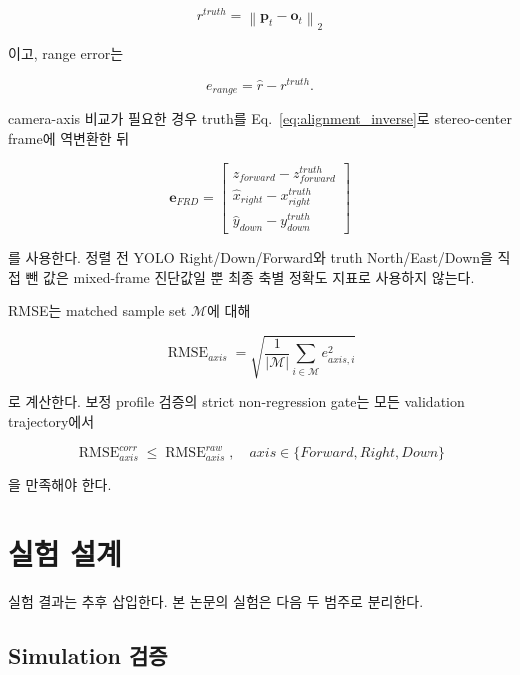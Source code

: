 \documentclass[10pt,conference]{IEEEtran}
\newcommand{\vect}[1]{\bm{#1}}
\newcommand{\norm}[1]{\left\lVert #1 \right\rVert_2}
\begin{document}
\begin{equation}
r^{truth}
=
\norm{
\vect{p}_{t}-\vect{o}_{t}
}
\end{equation}

이고, range error는

\begin{equation}
e_{range}
=
\hat{r}-r^{truth}.
\label{eq:range_error}
\end{equation}

camera-axis 비교가 필요한 경우 truth를 Eq.~\eqref{eq:alignment_inverse}로 stereo-center frame에 역변환한 뒤

\begin{equation}
\vect{e}_{FRD}
=
\begin{bmatrix}
\hat{z}_{forward}-z_{forward}^{truth}\\
\hat{x}_{right}-x_{right}^{truth}\\
\hat{y}_{down}-y_{down}^{truth}
\end{bmatrix}
\end{equation}

를 사용한다.
정렬 전 YOLO Right/Down/Forward와 truth North/East/Down을 직접 뺀 값은 mixed-frame 진단값일 뿐 최종 축별 정확도 지표로 사용하지 않는다.

RMSE는 matched sample set $\mathcal{M}$에 대해

\begin{equation}
\operatorname{RMSE}_{axis}
=
\sqrt{
\frac{1}{|\mathcal{M}|}
\sum_{i\in\mathcal{M}}
e_{axis,i}^{2}
}
\end{equation}

로 계산한다.
보정 profile 검증의 strict non-regression gate는 모든 validation trajectory에서

\begin{equation}
\operatorname{RMSE}_{axis}^{corr}
\le
\operatorname{RMSE}_{axis}^{raw},
\quad
axis\in\{Forward,Right,Down\}
\label{eq:non_regression}
\end{equation}

을 만족해야 한다.

\section{실험 설계}

실험 결과는 추후 삽입한다.
본 논문의 실험은 다음 두 범주로 분리한다.

\subsection{Simulation 검증}
\end{document}
